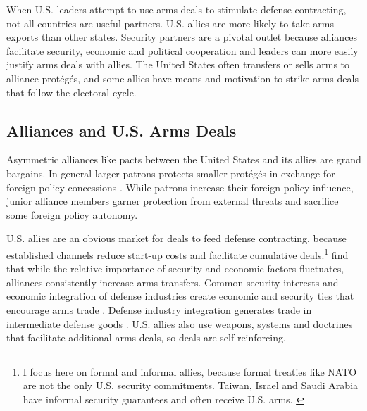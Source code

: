 \documentclass[12pt]{article}
\begin{document}
When U.S. leaders attempt to use arms deals to stimulate defense contracting, not all countries are useful partners. 
U.S. allies are more likely to take arms exports than other states. 
Security partners are a pivotal outlet because alliances facilitate security, economic and political cooperation and leaders can more easily justify arms deals with allies. 
The United States often transfers or sells arms to alliance prot{\'e}g{\'e}s, and some allies have means and motivation to strike arms deals that follow the electoral cycle. 



\subsection{Alliances and U.S. Arms Deals}


Asymmetric alliances like pacts between the United States and its allies are grand bargains.
In general larger patrons protects smaller prot{\'e}g{\'e}s in exchange for foreign policy concessions \citep{Morrow1991}.
While patrons increase their foreign policy influence, junior alliance members garner protection from external threats and sacrifice some foreign policy autonomy.




U.S. allies are an obvious market for deals to feed defense contracting, because established channels reduce start-up costs and facilitate cumulative deals.\footnote{I focus here on formal and informal allies, because formal treaties like NATO are not the only U.S. security commitments. Taiwan, Israel and Saudi Arabia have informal security guarantees and often receive U.S. arms. \citep{Yarhi-Miloetal2016}}
\citet{Thurneretal2019} find that while the relative importance of security and economic factors fluctuates, alliances consistently increase arms transfers.
Common security interests and economic integration of defense industries create economic and security ties that encourage arms trade \citep{Bitzinger1994}. 
Defense industry integration generates trade in intermediate defense goods \citep{Brooks2005}. 
U.S. allies also use weapons, systems and doctrines that facilitate additional arms deals, so deals are self-reinforcing. 
\end{document}

